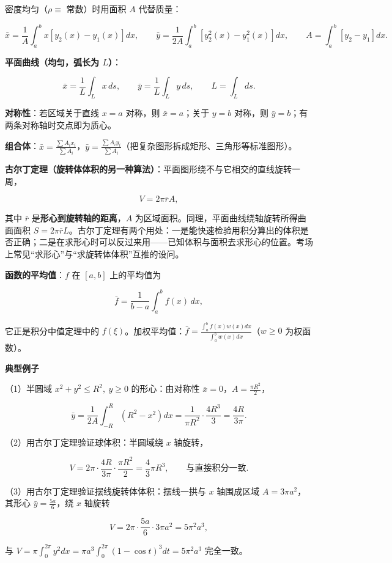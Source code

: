 \documentclass[11pt,openany,UTF8]{ctexbook}
\begin{document}
密度均匀（$\rho\equiv$ 常数）时用面积 $A$ 代替质量：

\[\bar{x}=\frac{1}{A}\int_a^bx\left[y_2(x)-y_1(x)\right]dx,\qquad \bar{y}=\frac{1}{2A}\int_a^b\left[y_2^2(x)-y_1^2(x)\right]dx,\qquad A=\int_a^b\left[y_2-y_1\right]dx.\]

\textbf{平面曲线（均匀，弧长为 $L$）}：

\[\bar{x}=\frac{1}{L}\int_Lx\,ds,\qquad \bar{y}=\frac{1}{L}\int_Ly\,ds,\qquad L=\int_Lds.\]

\textbf{对称性}：若区域关于直线 $x=a$ 对称，则 $\bar{x}=a$；关于 $y=b$ 对称，则 $\bar{y}=b$；有两条对称轴时交点即为质心。

\textbf{组合体}：$\bar{x}=\frac{\sum A_ix_i}{\sum A_i}$，$\bar{y}=\frac{\sum A_iy_i}{\sum A_i}$（把复杂图形拆成矩形、三角形等标准图形）。

\textbf{古尔丁定理（旋转体体积的另一种算法）}：平面图形绕不与它相交的直线旋转一周，

\[V=2\pi\bar{r}A,\]

其中 $\bar{r}$ 是\textbf{形心到旋转轴的距离}，$A$ 为区域面积。同理，平面曲线绕轴旋转所得曲面面积 $S=2\pi\bar{r}L$。古尔丁定理有两个用处：一是能快速检验用积分算出的体积是否正确；二是在求形心时可以反过来用——已知体积与面积去求形心的位置。考场上常见“求形心”与“求旋转体体积”互推的设问。

\textbf{函数的平均值}：$f$ 在 $[a,b]$ 上的平均值为

\[\bar{f}=\frac{1}{b-a}\int_a^bf(x)\,dx,\]

它正是积分中值定理中的 $f(\xi)$。加权平均值：$\bar{f}=\frac{\int_a^bf(x)w(x)dx}{\int_a^bw(x)dx}$（$w\geq0$ 为权函数）。

\textbf{典型例子}

（1）半圆域 $x^2+y^2\leq R^2,\ y\geq0$ 的形心：由对称性 $\bar{x}=0$，$A=\frac{\pi R^2}{2}$，

\[\bar{y}=\frac{1}{2A}\int_{-R}^{R}\left(R^2-x^2\right)dx=\frac{1}{\pi R^2}\cdot\frac{4R^3}{3}=\frac{4R}{3\pi}.\]

（2）用古尔丁定理验证球体积：半圆域绕 $x$ 轴旋转，

\[V=2\pi\cdot\frac{4R}{3\pi}\cdot\frac{\pi R^2}{2}=\frac{4}{3}\pi R^3,\qquad\text{与直接积分一致}.\]

（3）用古尔丁定理验证摆线旋转体体积：摆线一拱与 $x$ 轴围成区域 $A=3\pi a^2$，其形心 $\bar{y}=\frac{5a}{6}$，绕 $x$ 轴旋转

\[V=2\pi\cdot\frac{5a}{6}\cdot3\pi a^2=5\pi^2a^3,\]

与 $V=\pi\int_0^{2\pi}y^2dx=\pi a^3\int_0^{2\pi}(1-\cos t)^3dt=5\pi^2a^3$ 完全一致。
\end{document}
